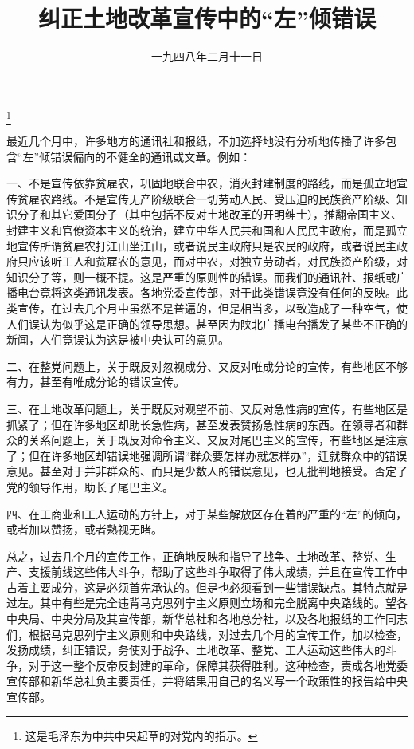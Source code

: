
\title{纠正土地改革宣传中的“左”倾错误}
\date{一九四八年二月十一日}
\thanks{这是毛泽东为中共中央起草的对党内的指示。}
\maketitle


最近几个月中，许多地方的通讯社和报纸，不加选择地没有分析地传播了许多包含“左”倾错误偏向的不健全的通讯或文章。例如：

一、不是宣传依靠贫雇农，巩固地联合中农，消灭封建制度的路线，而是孤立地宣传贫雇农路线。不是宣传无产阶级联合一切劳动人民、受压迫的民族资产阶级、知识分子和其它爱国分子（其中包括不反对土地改革的开明绅士），推翻帝国主义、封建主义和官僚资本主义的统治，建立中华人民共和国和人民民主政府，而是孤立地宣传所谓贫雇农打江山坐江山，或者说民主政府只是农民的政府，或者说民主政府只应该听工人和贫雇农的意见，而对中农，对独立劳动者，对民族资产阶级，对知识分子等，则一概不提。这是严重的原则性的错误。而我们的通讯社、报纸或广播电台竟将这类通讯发表。各地党委宣传部，对于此类错误竟没有任何的反映。此类宣传，在过去几个月中虽然不是普遍的，但是相当多，以致造成了一种空气，使人们误认为似乎这是正确的领导思想。甚至因为陕北广播电台播发了某些不正确的新闻，人们竟误认为这是被中央认可的意见。

二、在整党问题上，关于既反对忽视成分、又反对唯成分论的宣传，有些地区不够有力，甚至有唯成分论的错误宣传。

三、在土地改革问题上，关于既反对观望不前、又反对急性病的宣传，有些地区是抓紧了；但在许多地区却助长急性病，甚至发表赞扬急性病的东西。在领导者和群众的关系问题上，关于既反对命令主义、又反对尾巴主义的宣传，有些地区是注意了；但在许多地区却错误地强调所谓“群众要怎样办就怎样办”，迁就群众中的错误意见。甚至对于并非群众的、而只是少数人的错误意见，也无批判地接受。否定了党的领导作用，助长了尾巴主义。

四、在工商业和工人运动的方针上，对于某些解放区存在着的严重的“左”的倾向，或者加以赞扬，或者熟视无睹。

总之，过去几个月的宣传工作，正确地反映和指导了战争、土地改革、整党、生产、支援前线这些伟大斗争，帮助了这些斗争取得了伟大成绩，并且在宣传工作中占着主要成分，这是必须首先承认的。但是也必须看到一些错误缺点。其特点就是过左。其中有些是完全违背马克思列宁主义原则立场和完全脱离中央路线的。望各中央局、中央分局及其宣传部，新华总社和各地总分社，以及各地报纸的工作同志们，根据马克思列宁主义原则和中央路线，对过去几个月的宣传工作，加以检查，发扬成绩，纠正错误，务使对于战争、土地改革、整党、工人运动这些伟大的斗争，对于这一整个反帝反封建的革命，保障其获得胜利。这种检查，责成各地党委宣传部和新华总社负主要责任，并将结果用自己的名义写一个政策性的报告给中央宣传部。
